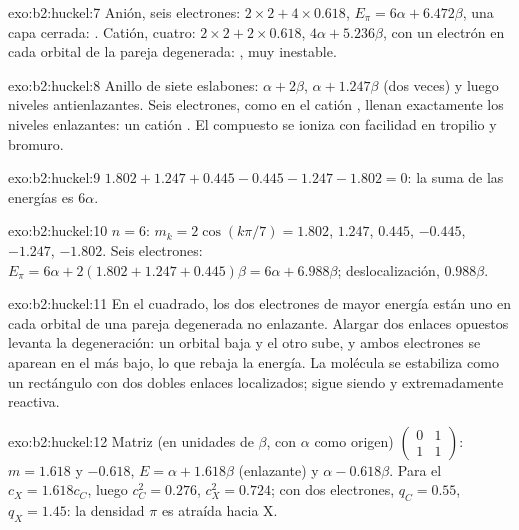 \begin{solution}{exo:b2:huckel:7}
Anión, seis electrones: $2 \times 2 + 4 \times 0.618$, $E_\pi = 6\alpha + 6.472\beta$, una capa cerrada:
. Catión, cuatro: $2 \times 2 + 2 \times 0.618$, $4\alpha + 5.236\beta$, con un electrón
en cada orbital de la pareja degenerada: , muy inestable.
\end{solution}

\begin{solution}{exo:b2:huckel:8}
Anillo de siete eslabones: $\alpha + 2\beta$, $\alpha + 1.247\beta$ (dos veces) y luego niveles antienlazantes. Seis
electrones, como en el catión , llenan exactamente los niveles enlazantes: un catión
. El compuesto se ioniza con facilidad en tropilio y bromuro.
\end{solution}

\begin{solution}{exo:b2:huckel:9}
$1.802 + 1.247 + 0.445 - 0.445 - 1.247 - 1.802 = 0$: la suma de las energías es $6\alpha$.
\end{solution}

\begin{solution}{exo:b2:huckel:10}
$n = 6$: $m_k = 2\cos(k\pi/7) = 1.802$, $1.247$, $0.445$, $-0.445$, $-1.247$, $-1.802$. Seis
electrones: $E_\pi = 6\alpha + 2(1.802 + 1.247 + 0.445)\beta = 6\alpha + 6.988\beta$;
deslocalización, $0.988\beta$.
\end{solution}

\begin{solution}{exo:b2:huckel:11}
En el cuadrado, los dos electrones de mayor energía están uno en cada orbital de una
pareja degenerada no enlazante. Alargar dos enlaces opuestos levanta la degeneración:
un orbital baja y el otro sube, y ambos electrones se aparean en el más bajo, lo que
rebaja la energía. La molécula se estabiliza como un rectángulo con dos dobles enlaces
localizados; sigue siendo  y extremadamente reactiva.
\end{solution}

\begin{solution}{exo:b2:huckel:12}
Matriz (en unidades de $\beta$, con $\alpha$ como origen) $\begin{pmatrix}0 & 1\\ 1 & 1\end{pmatrix}$:
$m = 1.618$ y $-0.618$, $E = \alpha + 1.618\beta$ (enlazante) y $\alpha - 0.618\beta$. Para el
 $c_X = 1.618c_C$, luego $c_C^2 = 0.276$, $c_X^2 = 0.724$; con dos electrones,
$q_C = 0.55$, $q_X = 1.45$: la densidad $\pi$ es atraída hacia X.
\end{solution}

